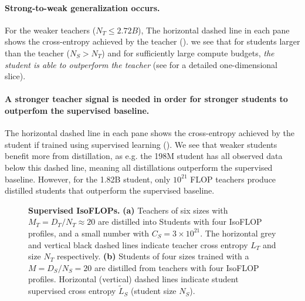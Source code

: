\paragraph{Strong-to-weak generalization occurs.} For the weaker teachers ($N_T\leq 2.72B$),
The horizontal dashed line in each pane shows the cross-entropy achieved by the teacher ().
we see that for students larger than the teacher ($N_S>N_T$) and for sufficiently large compute budgets, 
\emph{the student is able to outperform the teacher}
(see  for a detailed one-dimensional slice).

\paragraph{A stronger teacher signal is needed in order for stronger students to outperfom the supervised baseline.}
The horizontal dashed line in each pane shows the cross-entropy achieved by the student if trained using supervised learning ().
We see that weaker students benefit more from distillation, as e.g. the 198M student has all observed data below this dashed line, meaning all distillations outperform the supervised baseline.
However, for the 1.82B student, only $10^{21}$ FLOP teachers produce distilled students that outperform the supervised baseline.

\begin{figure}[h]
	\centering
    \vspace{-0.1cm}
    \vspace{-0.1cm}
	\caption{\textbf{Supervised IsoFLOPs.}
	\textbf{(a)} Teachers of six sizes with $M_T=D_T/N_T\approx 20$
    are distilled into Students with four IsoFLOP profiles, and a small number with $C_S=3\times 10^{21}$.
    The horizontal grey and vertical black dashed lines indicate teacher cross entropy $L_T$ and size $N_T$ respectively.
	\textbf{(b)} Students of four sizes
    trained with a $M=D_S/N_S=20$ are distilled from teachers with four IsoFLOP profiles.
    Horizontal (vertical) dashed lines indicate student supervised cross entropy $\widetilde{L}_S$ (student size $N_S$).}
    \vspace{-0.1cm}
	\label{fig:distillation-isoflops}
\end{figure}







